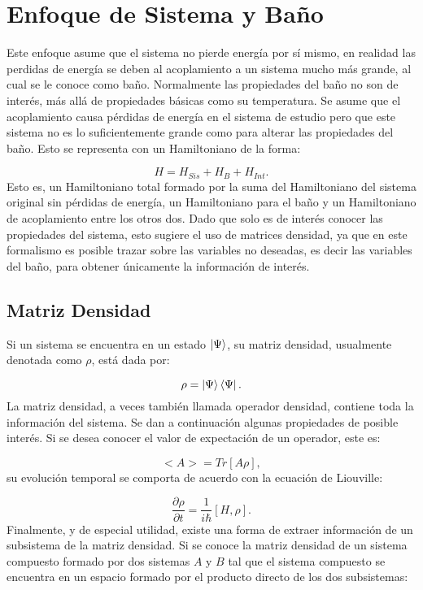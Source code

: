 \documentclass[a4paper,10pt]{report}
\begin{document}
\section{Enfoque de Sistema y Baño}

Este enfoque asume que el sistema no pierde energía por sí mismo, en realidad las perdidas de energía se deben al acoplamiento a un sistema mucho más grande, al cual se le conoce como baño. Normalmente las propiedades del baño no son de interés, más allá de propiedades básicas como su temperatura. Se asume que el acoplamiento causa pérdidas de energía en el sistema de estudio pero que este sistema no es lo suficientemente grande como para alterar las propiedades del baño. Esto se representa con un Hamiltoniano de la forma:

\begin{equation} \label{BathSysH}
H = H_{Sis} + H_{B} + H_{Int}.
\end{equation} Esto es, un Hamiltoniano total formado por la suma del Hamiltoniano del sistema original sin pérdidas de energía, un Hamiltoniano para el baño y un Hamiltoniano de acoplamiento entre los otros dos.  Dado que solo es de interés conocer las propiedades del sistema, esto sugiere el uso de matrices densidad, ya que en este formalismo es posible trazar sobre las variables no deseadas, es decir las variables del baño, para obtener únicamente la información de interés.

\subsection{Matriz Densidad}

Si un sistema se encuentra en un estado $\Ket{\Psi}$, su matriz densidad\cite{BlumDM}, usualmente denotada como $\rho$, está dada por:

\begin{equation}
\rho = \Ket{\Psi}\Bra{\Psi}.
\end{equation} La matriz densidad, a veces también llamada operador densidad, contiene toda la información del sistema. Se dan a continuación algunas propiedades de posible interés. Si se desea conocer el valor de expectación de un operador, este es:

\begin{equation}
<A> = Tr[A\rho],
\end{equation} su evolución temporal se comporta de acuerdo con la ecuación de Liouville:

\begin{equation}
\dfrac{\partial \rho}{\partial t} = \frac{1}{i\hbar}[H,\rho].
\end{equation} Finalmente, y de especial utilidad, existe una forma de extraer información de un subsistema de la matriz densidad. Si se conoce la matriz densidad de un sistema compuesto formado por dos sistemas $A$ y $B$ tal que el sistema compuesto se encuentra en un espacio formado por el producto directo de los dos subsistemas:
\end{document}
